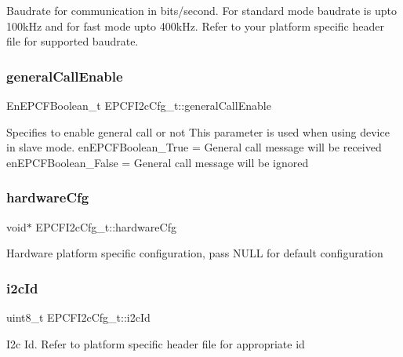 Baudrate for communication in bits/second. For standard mode baudrate is upto 100k\+Hz and for fast mode upto 400k\+Hz. Refer to your platform specific header file for supported baudrate. \mbox{\label{structEPCFI2cCfg__t_a96a1d83f32bfdd572fc4f4cb761be77f}} 
\subsubsection{\texorpdfstring{general\+Call\+Enable}{generalCallEnable}}
{\footnotesize\ttfamily En\+E\+P\+C\+F\+Boolean\+\_\+t E\+P\+C\+F\+I2c\+Cfg\+\_\+t\+::general\+Call\+Enable}

Specifies to enable general call or not This parameter is used when using device in slave mode. en\+E\+P\+C\+F\+Boolean\+\_\+\+True = General call message will be received en\+E\+P\+C\+F\+Boolean\+\_\+\+False = General call message will be ignored \mbox{\label{structEPCFI2cCfg__t_ab09efee943f748026eca099031f8bcda}} 
\subsubsection{\texorpdfstring{hardware\+Cfg}{hardwareCfg}}
{\footnotesize\ttfamily void$\ast$ E\+P\+C\+F\+I2c\+Cfg\+\_\+t\+::hardware\+Cfg}

Hardware platform specific configuration, pass N\+U\+LL for default configuration \mbox{\label{structEPCFI2cCfg__t_a242335b86cbb644f8c508a3f4542cba4}} 
\subsubsection{\texorpdfstring{i2c\+Id}{i2cId}}
{\footnotesize\ttfamily uint8\+\_\+t E\+P\+C\+F\+I2c\+Cfg\+\_\+t\+::i2c\+Id}

I2c Id. Refer to platform specific header file for appropriate id \mbox{\label{structEPCFI2cCfg__t_a4d9b944d5a24e937a8c954f4ef1ddeac}} 
